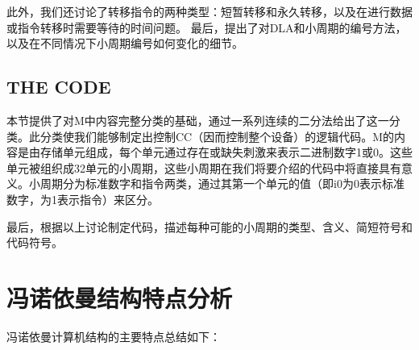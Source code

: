 \documentclass[12pt]{article} %
\theoremstyle{definition}
\begin{document}
此外，我们还讨论了转移指令的两种类型：短暂转移和永久转移，以及在进行数据或指令转移时需要等待的时间问题。
最后，提出了对DLA和小周期的编号方法，以及在不同情况下小周期编号如何变化的细节。

\subsection{THE CODE}

本节提供了对M中内容完整分类的基础，通过一系列连续的二分法给出了这一分类。此分类使我们能够制定出控制CC（因而控制整个设备）的逻辑代码。M的内容是由存储单元组成，每个单元通过存在或缺失刺激来表示二进制数字1或0。这些单元被组织成32单元的小周期，这些小周期在我们将要介绍的代码中将直接具有意义。小周期分为标准数字和指令两类，通过其第一个单元的值（即i0为0表示标准数字，为1表示指令）来区分。

最后，根据以上讨论制定代码，描述每种可能的小周期的类型、含义、简短符号和代码符号。

\section{冯诺依曼结构特点分析}

冯诺依曼计算机结构的主要特点总结如下\cite{vonNeumann1945edvac}：
\end{document}
